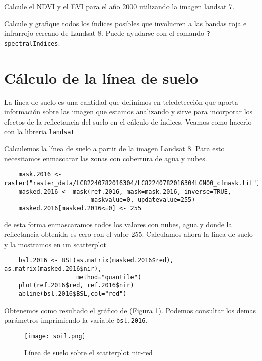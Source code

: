 \begin{act}
    Calcule el NDVI y el EVI para el año 2000 utilizando la imagen landsat 7.
\end{act}

\begin{act}
    Calcule y grafique todos los \'indices posibles que involucren a las bandas
    roja e infrarrojo cercano de Landsat 8. Puede ayudarse con el comando
    \texttt{?spectralIndices}.
\end{act}

\section{C\'alculo de la l\'inea de suelo}

La l\'inea de suelo es una cantidad que definimos en teledetecci\'on que aporta
informaci\'on sobre las imagen que estamos analizando y sirve para incorporar
los efectos de la reflectancia del suelo en el c\'alculo de \'indices.
Veamos como hacerlo con la libreria \texttt{landsat}

\begin{exa}
    Calculemos la l\'inea de suelo a partir de la imagen Landsat 8.
    Para esto necesitamos enmascarar las zonas con
    cobertura de agua y nubes.
    \begin{lstlisting}
    mask.2016 <- raster("raster_data/LC82240782016304/LC82240782016304LGN00_cfmask.tif")
    masked.2016 <- mask(ref.2016, mask=mask.2016, inverse=TRUE,
                        maskvalue=0, updatevalue=255)
    masked.2016[masked.2016<=0] <- 255
    \end{lstlisting}
    de esta forma enmascaramos todos los valores con nubes, agua y donde la
    reflectancia obtenida es cero con el valor 255.
    Calculamos ahora la l\'inea de suelo y la mostramos en un scatterplot
    \begin{lstlisting}
    bsl.2016 <- BSL(as.matrix(masked.2016$red), as.matrix(masked.2016$nir),
                    method="quantile")
    plot(ref.2016$red, ref.2016$nir)
    abline(bsl.2016$BSL,col="red")
    \end{lstlisting}
    Obtenemos como resultado el gr\'afico de (Figura \ref{fig:soil}). Podemos consultar
    los demas par\'ametros imprimiendo la variable \texttt{bsl.2016}.
    \begin{figure}[h!]
    \begin{center}
        \texttt{[image: soil.png]}
    \end{center}
    \caption{L\'inea de suelo sobre el scatterplot nir-red}
    \label{fig:soil}
    \end{figure}

\end{exa}

